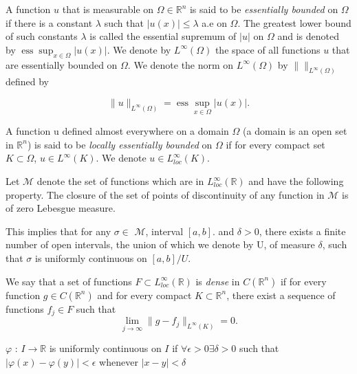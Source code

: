 \documentclass[../main.tex]{subfiles}
\begin{document}
\begin{definition}
	A function $u$ that is measurable on  $\Omega \in \mathbb{R}^n$ is said to be \emph{essentially bounded} on $\Omega$ if there is a constant $\lambda$ such that $|u(x)|\leq \lambda$ a.e on $\Omega$.  The greatest lower bound of such constants $\lambda$ is called the essential supremum of $|u|$ on $\Omega$ and is denoted by $\operatorname{ess} \sup_{x\in \Omega} |u(x)|$. We denote by $L^{\infty}(\Omega)$ the space of all functions $u$ that are essentially bounded on $\Omega$. We denote the norm on $L^{\infty}(\Omega)$ by $\| \|_{L^{\infty}(\Omega)}$ defined by

$$	\|u\|_{L^{\infty}(\Omega)} = \operatorname{ess} \sup_{x\in \Omega} |u(x)|.$$

\end{definition}


\begin{definition}
	A function u defined almost everywhere on a domain $\Omega$ (a domain is an open set in $\mathbb{R}^n$) is said to be\emph{ locally essentially bounded }on $\Omega$ if for every compact set $K\subset \Omega$, $u\in L^{\infty}(K)$. We denote $u\in L_{loc}^{\infty}(K)$.
\end{definition}

\begin{definition} Let  $\mathcal{M}$ denote the set of functions which are in $L_{loc}^{\infty}(\mathbb{R})$ and have the following property. The closure of the set of points of discontinuity of any function in $\mathcal{M}$ is of zero Lebesgue measure. 
\end{definition}
\noindent This implies that for any $\sigma \in$ $\mathcal{M}$, interval $[a,b] .$ and $\delta >0$, there exists a finite number of open intervals, the union of which we denote by U, of measure $\delta$, such that $\sigma$ is uniformly continuous on $[a,b]/U$. 


\begin{definition}We say that a set of functions $F\subset L_{loc}^{\infty}(\mathbb{R})$ is \emph{dense} in $C(\mathbb{R}^n)$ if for every function $g\in C(\mathbb{R}^n)$ and for every compact $K\subset \mathbb{R}^n$, there exist a sequence of functions $f_j\in F$ such that $$\lim_{j\rightarrow\infty} \|g-f_j\|_{L^\infty(K)}=0.$$ 
\end{definition}



\begin{definition} 
	$\varphi$ : $I \rightarrow \mathbb{R}$ is uniformly continuous on $I$ if $\forall \epsilon > 0 \exists \delta >0 $ such that $|\varphi(x)- \varphi(y)| < \epsilon$ whenever $|x-y|< \delta$
\end{definition}
\end{document}
